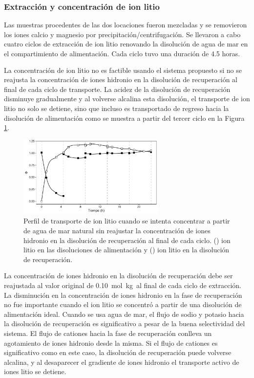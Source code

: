 \subsubsection{Extracción y concentración de ion litio}

Las muestras procedentes de las dos locaciones fueron mezcladas y se removieron los iones calcio y magnesio por precipitación/centrifugación. Se llevaron a cabo cuatro ciclos de extracción de ion litio renovando la disolución de agua de mar en el compartimiento de alimentación. Cada ciclo tuvo una duración de 4.5 horas. 

La concentración de ion litio no es factible usando el sistema propuesto si no se reajusta la concentración de iones hidronio en la disolución de recuperación al final de cada ciclo de transporte. La acidez de la disolución de recuperación disminuye gradualmente y al volverse alcalina esta disolución, el transporte de ion litio no solo se detiene, sino que incluso es transportado de regreso hacia la disolución de alimentación como se muestra a partir del tercer ciclo en la Figura \ref{fig:FAIL}. 

\begin{figure}[H]
    \centering
    \includegraphics[width=0.65\textwidth, trim = {0cm 0 0 0},   clip]{chap5/figures/LiConcAS-FAIL.pdf}
    \caption[Concentración de ion litio sin reajustar la acidez en la fase de recuperación.]{Perfil de transporte de ion litio cuando se intenta concentrar a partir de agua de mar natural sin reajustar la concentración de iones hidronio en la disolución de recuperación al final de cada ciclo. (\protect\squareblck) ion litio en las disoluciones de alimentación y (\protect\squarewht) ion litio en la disolución de recuperación.}
    \label{fig:FAIL}
\end{figure}

La concentración de iones hidronio en la disolución de recuperación debe ser reajustada al valor original de 0.10~mol~kg\mnn\ al final de cada ciclo de extracción. La disminución en la concentración de iones hidronio en la fase de recuperación no fue importante cuando el ion litio se concentró a partir de una disolución de alimentación ideal. Cuando se usa agua de mar, el flujo de sodio y potasio hacia la disolución de recuperación es significativo a pesar de la buena selectividad del sistema. El flujo de cationes hacia la fase de recuperación conlleva un agotamiento de iones hidronio desde la misma. Si el flujo de cationes es significativo como en este caso, la disolución de recuperación puede volverse alcalina, y al desaparecer el gradiente de iones hidronio el transporte activo de iones litio se detiene. 

